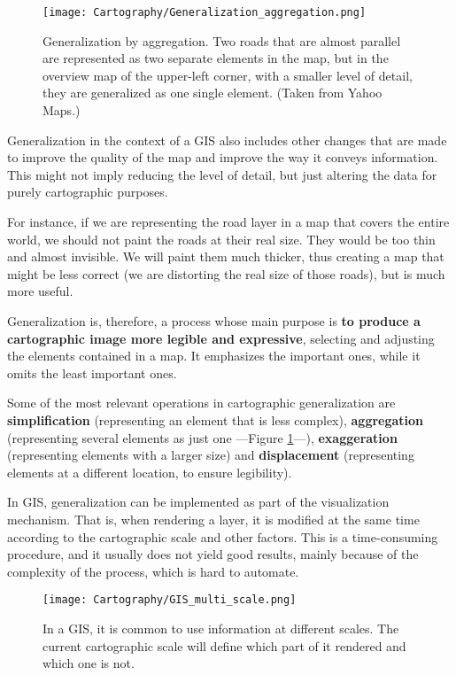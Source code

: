 \begin{figure}[!hbt]
\centering
\texttt{[image: Cartography/Generalization\_aggregation.png]}
\caption{\small Generalization by aggregation. Two roads that are almost parallel are represented as two separate elements in the map, but in the overview map of the upper-left corner, with a smaller level of detail, they are generalized as one single element. (Taken from Yahoo Maps.)}
\label{Fig:Generalization_aggregation} 
\end{figure}


Generalization in the context of a GIS also includes other changes that are made to improve the quality of the map and improve the way it conveys information. This might not imply reducing the level of detail, but just altering the data for purely cartographic purposes.

For instance, if we are representing the road layer in a map that covers the entire world, we should not paint the roads at their real size. They would be too thin and almost invisible. We will paint them much thicker, thus creating a map that might be less correct (we are distorting the real size of those roads), but is much more useful.

Generalization is, therefore, a process whose main purpose is \textbf{to produce a cartographic image more legible and expressive}, selecting and adjusting the elements contained in a map. It emphasizes the important ones, while it omits the least important ones.

Some of the most relevant operations in cartographic generalization are \textbf{simplification} (representing an element that is less complex), \textbf{aggregation} (representing several elements as just one ---Figure \ref{Fig:Generalization_aggregation}---), \textbf{exaggeration} (representing elements with a larger size) and \textbf{displacement} (representing elements at a different location, to ensure legibility).


In GIS, generalization can be implemented as part of the visualization mechanism. That is, when rendering a layer, it is modified at the same time according to the cartographic scale and other factors. This is a time-consuming procedure, and it usually does not yield good results, mainly because of the complexity of the process, which is hard to automate.

\begin{figure}[!hbt]
\centering
\texttt{[image: Cartography/GIS\_multi\_scale.png]}
\caption{\small In a GIS, it is common to use information at different scales. The current cartographic scale will define which part of it rendered and which one is not.}
\label{Fig:GIS_multi_scale} 
\end{figure}

